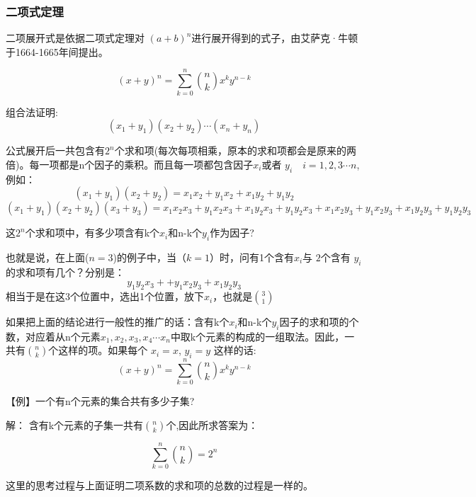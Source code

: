 \subsubsection{二项式定理}

二项展开式是依据二项式定理对 $ (a+b)^{n} $进行展开得到的式子，由艾萨克·牛顿于1664-1665年间提出。

\begin{tcolorbox}[title = {二项式定理}]{\indent}

$$
(x+y )^{n} = \sum_{ k=0 }^{ n }  { n \choose k} x^{k}y^{n-k}
$$
\qquad

\end{tcolorbox}	

组合法证明:
$$
(x_{1}+y_{1})(x_{2}+y_{2})\cdots(x_{n}+y_{n})
$$

公式展开后一共包含有$2^{n}$个求和项(每次每项相乘，原本的求和项都会是原来的两倍)。每一项都是n个因子的乘积。而且每一项都包含因子$x_{i}$或者 $y_{i} \quad i =1,2,3\cdots n$,例如：
$$
(x_{1}+y_{1})(x_{2}+y_{2}) = x_{1}x_{2} + y_{1}x_{2} + x_{1}y_{2} + y_{1}y_{2}
$$
$$
(x_{1}+y_{1})(x_{2}+y_{2})(x_{3}+y_{3})  = x_{1}x_{2}x_{3}  + y_{1}x_{2}x_{3}  + x_{1}y_{2}x_{3}  + y_{1}y_{2}x_{3} + x_{1}x_{2}y_{3}  + y_{1}x_{2}y_{3}  + x_{1}y_{2}y_{3}  + y_{1}y_{2}y_{3} 
$$

这$2^{n}$个求和项中，有多少项含有k个$x_{i}$和n-k个$y_{i}$作为因子?

也就是说，在上面($n=3$)的例子中，当（$k=1$）时，问有1个含有$x_{i}$与 $2$个含有 $y_{i}$的求和项有几个？分别是：
$$
y_{1}y_{2}x_{3} +  + y_{1}x_{2}y_{3}  + x_{1}y_{2}y_{3}  
$$
相当于是在这3个位置中，选出1个位置，放下$x_{i}$，也就是$\displaystyle {3 \choose 1} $

如果把上面的结论进行一般性的推广的话：含有k个$x_{i}$和n-k个$y_{i}$因子的求和项的个数，对应着从n个元素$x_{1},x_{2},x_{3},x_{4}\cdots x_{n}$中取k个元素的构成的一组取法。因此，一共有$ \displaystyle {n \choose k }$个这样的项。如果每个 $x_{i} = x$, $y_{i} = y$ 这样的话:
$$
(x+y )^{n} = \sum_{ k=0 }^{ n }  { n \choose k} x^{k}y^{n-k}
$$
\par\vspace{\baselineskip}


【例】一个有n个元素的集合共有多少子集?

解： 含有k个元素的子集一共有$ \displaystyle { n \choose k }$个,因此所求答案为：

$$
\sum_{ k=0 }^{ n }  { n \choose k} = 2^{n}
$$

这里的思考过程与上面证明二项系数的求和项的总数的过程是一样的。


